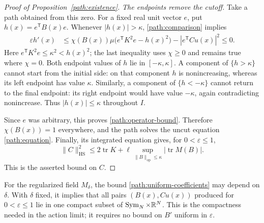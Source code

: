 \begin{proof}[Proof of Proposition~\ref{path:existence}]
\smallskip
\noindent\emph{The endpoints remove the cutoff.}
Take a path obtained from this zero.  For a fixed real unit vector
$e$, put $h(x)=e^{\mathsf T}B(x)e$.  Whenever $|h(x)|>\kappa$,
\eqref{path:comparison} implies
\begin{align*}
 \varepsilon h'(x)
 &\leq\chi(B(x))
    \mu\bigl(e^{\mathsf T}K^2e-h(x)^2\bigr)
       -|e^{\mathsf T}Cu(x)|^2
 \leq0.
\end{align*}
Here $e^{\mathsf T}K^2e\leq\kappa^2<h(x)^2$; the last inequality
uses $\chi\geq0$ and remains true where $\chi=0$.
Both endpoint values of $h$ lie in $[-\kappa,\kappa]$.
A component of $\{h>\kappa\}$ cannot start from the initial side:
on that component $h$ is nonincreasing, whereas its left endpoint
has value $\kappa$.  Similarly, a component of $\{h<-\kappa\}$
cannot return to the final endpoint: its right endpoint would have
value $-\kappa$, again contradicting nonincrease.  Thus
$|h(x)|\leq\kappa$ throughout $I$.

Since $e$ was arbitrary, this proves
\eqref{path:operator-bound}.  Therefore $\chi(B(x))=1$ everywhere,
and the path solves the uncut equation \eqref{path:equation}.
Finally, its integrated equation gives, for $0<\varepsilon\leq1$,
\begin{equation}\label{path:uniform-coefficients}
 \|C\|_{\mathrm{HS}}^2
 \leq 2\operatorname{tr}K
 +\ell\sup_{\|B\|_{\mathrm{op}}\leq\kappa}
             |\operatorname{tr}M(B)|.
\end{equation}
This is the asserted bound on $C$.
\end{proof}

For the regularized field $M_\delta$, the bound
\eqref{path:uniform-coefficients} may depend on $\delta$.
With $\delta$ fixed, it implies that all pairs $(B(x),Cu(x))$ produced
for $0<\varepsilon\leq1$ lie in one compact subset of
$\operatorname{Sym}_N\times\mathbb R^N$.
This is the compactness needed in the action limit; it requires no
bound on $B'$ uniform in $\varepsilon$.
